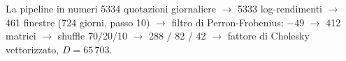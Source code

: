 \begin{riquadro}{La pipeline in numeri}
5334 quotazioni giornaliere $\rightarrow$ 5333 log-rendimenti $\rightarrow$ 461 finestre (724 giorni, passo 10) $\rightarrow$ filtro di Perron-Frobenius: $-49$ $\rightarrow$ 412 matrici $\rightarrow$ shuffle 70/20/10 $\rightarrow$ 288 / 82 / 42 $\rightarrow$ fattore di Cholesky vettorizzato, $D = 65\,703$.
\end{riquadro}
